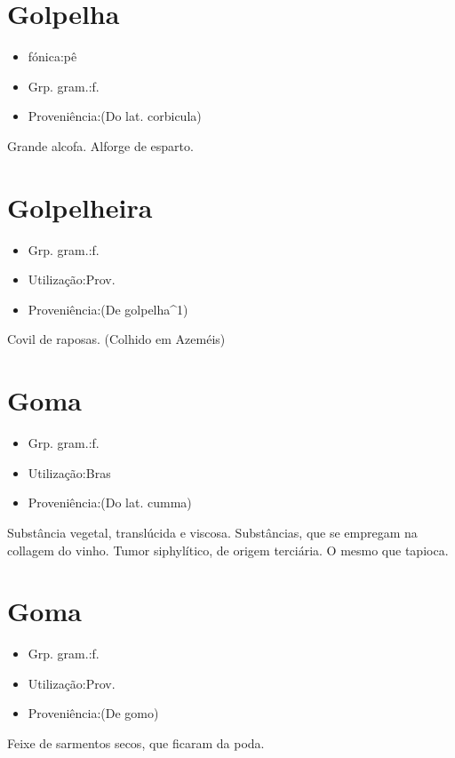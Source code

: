 \section{Golpelha}
\begin{itemize}
\item {fónica:pê}
\end{itemize}
\begin{itemize}
\item {Grp. gram.:f.}
\end{itemize}
\begin{itemize}
\item {Proveniência:(Do lat. \textunderscore corbicula\textunderscore )}
\end{itemize}
Grande alcofa.
Alforge de esparto.
\section{Golpelheira}
\begin{itemize}
\item {Grp. gram.:f.}
\end{itemize}
\begin{itemize}
\item {Utilização:Prov.}
\end{itemize}
\begin{itemize}
\item {Proveniência:(De \textunderscore golpelha\textunderscore ^1)}
\end{itemize}
Covil de raposas. (Colhido em Azeméis)
\section{Goma}
\begin{itemize}
\item {Grp. gram.:f.}
\end{itemize}
\begin{itemize}
\item {Utilização:Bras}
\end{itemize}
\begin{itemize}
\item {Proveniência:(Do lat. \textunderscore cumma\textunderscore )}
\end{itemize}
Substância vegetal, translúcida e viscosa.
Substâncias, que se empregam na collagem do vinho.
Tumor siphylítico, de origem terciária.
O mesmo que \textunderscore tapioca\textunderscore .
\section{Goma}
\begin{itemize}
\item {Grp. gram.:f.}
\end{itemize}
\begin{itemize}
\item {Utilização:Prov.}
\end{itemize}
\begin{itemize}
\item {Proveniência:(De \textunderscore gomo\textunderscore )}
\end{itemize}
Feixe de sarmentos secos, que ficaram da poda.
